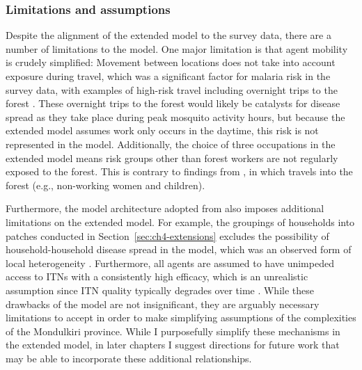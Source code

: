\subsubsection{Limitations and assumptions}

Despite the alignment of the extended model to the survey data, there are a number of limitations to the model. One major limitation is that agent mobility is crudely simplified: Movement between locations does not take into account exposure during travel, which was a significant factor for malaria risk in the survey data, with examples of high-risk travel including overnight trips to the forest \cite{sandfort_forest_2020}. These overnight trips to the forest would likely be catalysts for disease spread as they take place during peak mosquito activity hours, but because the extended model assumes work only occurs in the daytime, this risk is not represented in the model. Additionally, the choice of three occupations in the extended model means risk groups other than forest workers are not regularly exposed to the forest. This is contrary to findings from \citet{sandfort_forest_2020}, in which travels into the forest  (e.g., non-working women and children).

Furthermore, the model architecture adopted from \citet{manore_network-patch_2015} also imposes additional limitations on the extended model. For example, the groupings of households into patches conducted in Section~\ref{sec:ch4-extensions} excludes the possibility of household-household disease spread in the model, which was an observed form of local heterogeneity \cite{pepey_mobility_2022}. Furthermore, all agents are assumed to have unimpeded access to ITNs with a consistently high efficacy, which is an unrealistic assumption since ITN quality typically degrades over time \cite{manuv_investigating_2023}. While these drawbacks of the model are not insignificant, they are arguably necessary limitations to accept in order to make simplifying assumptions of the complexities of the Mondulkiri province. While I purposefully simplify these mechanisms in the extended model, in later chapters I suggest directions for future work that may be able to incorporate these additional relationships.